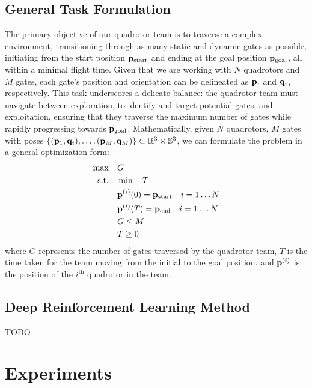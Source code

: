 \documentclass[letterpaper,journal,twoside]{IEEEtran}
\begin{document}
\subsection{General Task Formulation}

The primary objective of our quadrotor team is to traverse a 
complex environment, transitioning through as many static and 
dynamic gates as possible, initiating from the start position 
$ \mathbf{p}_{\text{start}} $ and ending at the goal position 
$ \mathbf{p}_{\text{goal}} $, all within a minimal flight time. 
Given that we are working with $ N $ quadrotors and $ M $ 
gates, 
each gate's position and orientation can be delineated as 
$ \mathbf{p}_i $
and $ \mathbf{q}_i$, respectively. 
This task underscores a delicate balance: 
the quadrotor team must navigate between 
exploration, to identify and target potential gates, 
and exploitation, 
ensuring that they traverse the maximum number of gates while 
rapidly progressing towards $ \mathbf{p}_{\text{goal}} $.
Mathematically, given $N$ quadrotors, $M$ gates 
with poses $\left\{(\mathbf{p}_1,\mathbf{q}_i), \dots, 
(\mathbf{p}_M, \mathbf{q}_M)\right\} 
\subset \mathbb{R}^3\times\mathbb{S}^3$, we can 
formulate the problem in a general optimization form:
\begin{equation}
  \label{eq:general_opt}
  \begin{aligned}
    \max \quad & G \\
    \textrm{s.t.} \quad & \min \quad T \\
    & \mathbf{p}^{(i)}(0) = \mathbf{p}_\text{start} \quad i = 1\dots N \\
    & \mathbf{p}^{(i)}(T) = \mathbf{p}_\text{end} \quad i = 1\dots N \\
    & G \le M \\
    & T \ge 0
  \end{aligned}
\end{equation}
where $G$ represents the number of gates traversed by the 
quadrotor team, $T$ is the time taken for the team moving
from the initial to the goal position, and $\mathbf{p}^{(i)}$ 
is the position of the $i^{\text{th}}$ quadrotor in the 
team. 


\subsection{Deep Reinforcement Learning Method}
TODO

\section{Experiments}







\end{document}
